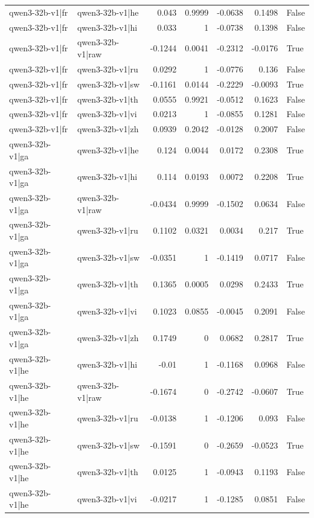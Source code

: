 \begin{table}
\begin{tabular}{l l r r r r l}
qwen3-32b-v1|fr & qwen3-32b-v1|he & 0.043 & 0.9999 & -0.0638 & 0.1498 & False \\
qwen3-32b-v1|fr & qwen3-32b-v1|hi & 0.033 & 1 & -0.0738 & 0.1398 & False \\
qwen3-32b-v1|fr & qwen3-32b-v1|raw & -0.1244 & 0.0041 & -0.2312 & -0.0176 & True \\
qwen3-32b-v1|fr & qwen3-32b-v1|ru & 0.0292 & 1 & -0.0776 & 0.136 & False \\
qwen3-32b-v1|fr & qwen3-32b-v1|sw & -0.1161 & 0.0144 & -0.2229 & -0.0093 & True \\
qwen3-32b-v1|fr & qwen3-32b-v1|th & 0.0555 & 0.9921 & -0.0512 & 0.1623 & False \\
qwen3-32b-v1|fr & qwen3-32b-v1|vi & 0.0213 & 1 & -0.0855 & 0.1281 & False \\
qwen3-32b-v1|fr & qwen3-32b-v1|zh & 0.0939 & 0.2042 & -0.0128 & 0.2007 & False \\
qwen3-32b-v1|ga & qwen3-32b-v1|he & 0.124 & 0.0044 & 0.0172 & 0.2308 & True \\
qwen3-32b-v1|ga & qwen3-32b-v1|hi & 0.114 & 0.0193 & 0.0072 & 0.2208 & True \\
qwen3-32b-v1|ga & qwen3-32b-v1|raw & -0.0434 & 0.9999 & -0.1502 & 0.0634 & False \\
qwen3-32b-v1|ga & qwen3-32b-v1|ru & 0.1102 & 0.0321 & 0.0034 & 0.217 & True \\
qwen3-32b-v1|ga & qwen3-32b-v1|sw & -0.0351 & 1 & -0.1419 & 0.0717 & False \\
qwen3-32b-v1|ga & qwen3-32b-v1|th & 0.1365 & 0.0005 & 0.0298 & 0.2433 & True \\
qwen3-32b-v1|ga & qwen3-32b-v1|vi & 0.1023 & 0.0855 & -0.0045 & 0.2091 & False \\
qwen3-32b-v1|ga & qwen3-32b-v1|zh & 0.1749 & 0 & 0.0682 & 0.2817 & True \\
qwen3-32b-v1|he & qwen3-32b-v1|hi & -0.01 & 1 & -0.1168 & 0.0968 & False \\
qwen3-32b-v1|he & qwen3-32b-v1|raw & -0.1674 & 0 & -0.2742 & -0.0607 & True \\
qwen3-32b-v1|he & qwen3-32b-v1|ru & -0.0138 & 1 & -0.1206 & 0.093 & False \\
qwen3-32b-v1|he & qwen3-32b-v1|sw & -0.1591 & 0 & -0.2659 & -0.0523 & True \\
qwen3-32b-v1|he & qwen3-32b-v1|th & 0.0125 & 1 & -0.0943 & 0.1193 & False \\
qwen3-32b-v1|he & qwen3-32b-v1|vi & -0.0217 & 1 & -0.1285 & 0.0851 & False \\

\end{tabular}
\end{table}
